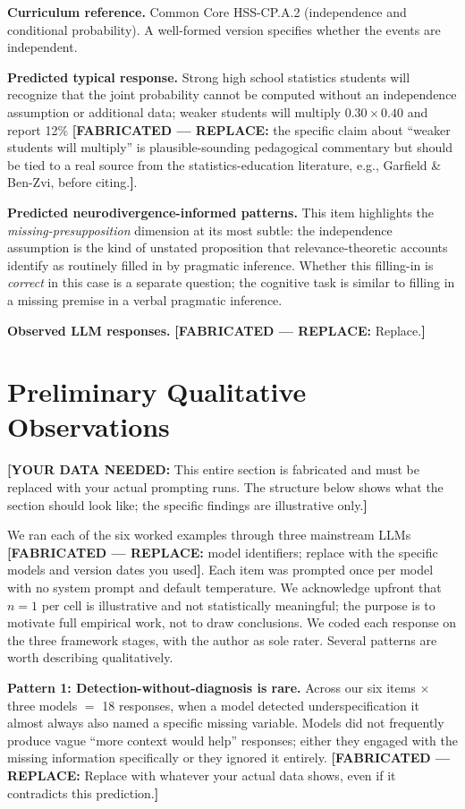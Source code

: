 \documentclass[11pt,letterpaper]{article}
\newcommand{\fabricated}[1]{{\color{red}\textbf{[FABRICATED --- REPLACE:} #1\textbf{]}}}
\newcommand{\dataneeded}[1]{{\color{blue}\textbf{[YOUR DATA NEEDED:} #1\textbf{]}}}
\begin{document}
\textbf{Curriculum reference.} Common Core HSS-CP.A.2 (independence and conditional probability). A well-formed version specifies whether the events are independent.

\textbf{Predicted typical response.} Strong high school statistics students will recognize that the joint probability cannot be computed without an independence assumption or additional data; weaker students will multiply $0.30 \times 0.40$ and report 12\% \fabricated{the specific claim about ``weaker students will multiply'' is plausible-sounding pedagogical commentary but should be tied to a real source from the statistics-education literature, e.g., Garfield \& Ben-Zvi, before citing.}.

\textbf{Predicted neurodivergence-informed patterns.} This item highlights the \emph{missing-presupposition} dimension at its most subtle: the independence assumption is the kind of unstated proposition that relevance-theoretic accounts \citep{sperber1995} identify as routinely filled in by pragmatic inference. Whether this filling-in is \emph{correct} in this case is a separate question; the cognitive task is similar to filling in a missing premise in a verbal pragmatic inference.

\textbf{Observed LLM responses.} \fabricated{Replace.}

\section{Preliminary Qualitative Observations}
\label{sec:observations}

\dataneeded{This entire section is fabricated and must be replaced with your actual prompting runs. The structure below shows what the section should look like; the specific findings are illustrative only.}

We ran each of the six worked examples through three mainstream LLMs \fabricated{model identifiers; replace with the specific models and version dates you used}. Each item was prompted once per model with no system prompt and default temperature. We acknowledge upfront that $n = 1$ per cell is illustrative and not statistically meaningful; the purpose is to motivate full empirical work, not to draw conclusions. We coded each response on the three framework stages, with the author as sole rater. Several patterns are worth describing qualitatively.

\textbf{Pattern 1: Detection-without-diagnosis is rare.} Across our six items $\times$ three models $=$ 18 responses, when a model detected underspecification it almost always also named a specific missing variable. Models did not frequently produce vague ``more context would help'' responses; either they engaged with the missing information specifically or they ignored it entirely. \fabricated{Replace with whatever your actual data shows, even if it contradicts this prediction.}
\end{document}

